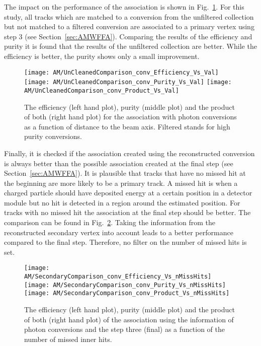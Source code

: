 The impact on the performance of the association is shown in Fig.~\ref{plot:AMWFSVpcEffAndPurRT}. For this study, all tracks which are matched to a conversion from the unfiltered collection but not matched to a filtered conversion are associated to a primary vertex using step 3 (see Section~\ref{sec:AMWFFA}). Comparing the results of the efficiency and purity it is found that the results of the unfiltered collection are better. While the efficiency is better, the purity shows only a small improvement.

\begin{figure}[!ht]
    \centering
    \texttt{[image: AM/UnCleanedComparison\_conv\_Efficiency\_Vs\_Val]}
    \texttt{[image: AM/UnCleanedComparison\_conv\_Purity\_Vs\_Val]}
    \texttt{[image: AM/UnCleanedComparison\_conv\_Product\_Vs\_Val]}
    \caption[Efficiency, purity and their product for the association with photon conversions a function of distance to the beam axis]{The efficiency (left hand plot), purity (middle plot) and the product of both (right hand plot) for the association with photon conversions as a function of distance to the beam axis. Filtered stands for high purity conversions.\label{plot:AMWFSVpcEffAndPurRT}}
\end{figure}

Finally, it is checked if the association created using the reconstructed conversion is always better than the possible association created at the final step (see Section~\ref{sec:AMWFFA}). It is plausible that tracks that have no missed hit at the beginning are more likely to be a primary track. A missed hit is when a charged particle should have deposited energy at a certain position in a detector module but no hit is detected in a region around the estimated position. For tracks with no missed hit the association at the final step should be better. The comparison can be found in Fig.~\ref{plot:AMWFSVpcEffAndPurVsFA}. Taking the information from the reconstructed secondary vertex into account leads to a better performance compared to the final step. Therefore, no filter on the number of missed hits is set.

\begin{figure}[!ht]
    \centering
    \texttt{[image: AM/SecondaryComparison\_conv\_Efficiency\_Vs\_nMissHits]}
    \texttt{[image: AM/SecondaryComparison\_conv\_Purity\_Vs\_nMissHits]}
    \texttt{[image: AM/SecondaryComparison\_conv\_Product\_Vs\_nMissHits]}
    \caption[Efficiency, purity and their product for  the association with photon conversions vs final association as a function of missed inner hits]{The efficiency (left hand plot), purity (middle plot) and the product of both (right hand plot) of the association using the information of photon conversions and the step three (final) as a function of the number of missed inner hits.\label{plot:AMWFSVpcEffAndPurVsFA}}
\end{figure}

